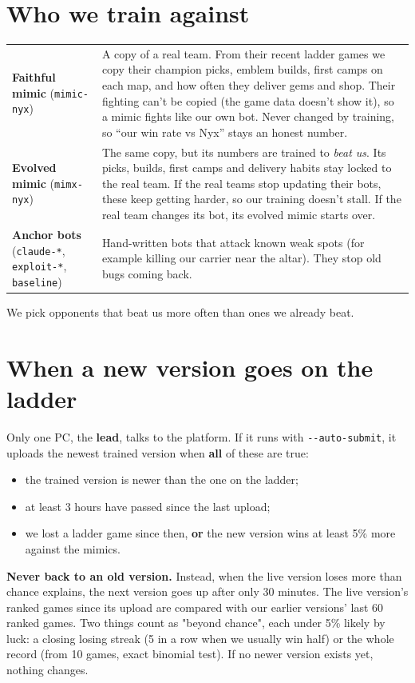 \documentclass[11pt,a4paper]{article}
\newcommand{\f}[1]{\texttt{#1}}
\begin{document}
\section{Who we train against}\label{sec:opp}
\begin{tabularx}{\linewidth}{@{}>{\raggedright\arraybackslash}p{3.6cm}X@{}}
\toprule
\textbf{Faithful mimic} (\f{mimic-nyx}) & A copy of a real team. From their recent ladder games we copy their
  champion picks, emblem builds, first camps on each map, and how often they deliver gems and shop. Their
  fighting can't be copied (the game data doesn't show it), so a mimic fights like our own bot.
  Never changed by training, so ``our win rate vs Nyx'' stays an honest number.\\
\textbf{Evolved mimic} (\f{mimx-nyx}) & The same copy, but its numbers are trained to \emph{beat us}.
  Its picks, builds, first camps and delivery habits stay locked to the real team. If the real teams stop
  updating their bots, these keep getting harder, so our training doesn't stall. If the real team changes
  its bot, its evolved mimic starts over.\\
\textbf{Anchor bots} (\f{claude-*}, \f{exploit-*}, \f{baseline}) & Hand-written bots that attack known
  weak spots (for example killing our carrier near the altar). They stop old bugs coming back.\\
\bottomrule
\end{tabularx}
We pick opponents that beat us more often than ones we already beat.

\section{When a new version goes on the ladder}\label{sec:release}
Only one PC, the \textbf{lead}, talks to the platform. If it runs with \f{-{}-auto-submit}, it uploads the
newest trained version when \textbf{all} of these are true:
\begin{itemize}
\item the trained version is newer than the one on the ladder;
\item at least 3 hours have passed since the last upload;
\item we lost a ladder game since then, \textbf{or} the new version wins at least 5\% more against the mimics.
\end{itemize}
\textbf{Never back to an old version.} Instead, when the live version loses more than chance explains,
the next version goes up after only 30 minutes. The live version's ranked games since its upload are
compared with our earlier versions' last 60 ranked games. Two things count as "beyond chance", each
under 5\% likely by luck: a closing losing streak (5 in a row when we usually win half) or the whole
record (from 10 games, exact binomial test). If no newer version exists yet, nothing changes.
\end{document}
